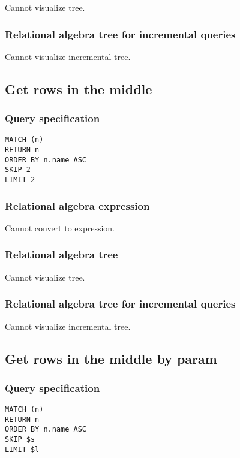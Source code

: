 Cannot visualize tree.

\subsubsection*{Relational algebra tree for incremental queries}

Cannot visualize incremental tree.

\subsection{Get rows in the middle}

\subsubsection*{Query specification}

\begin{lstlisting}
MATCH (n)
RETURN n
ORDER BY n.name ASC
SKIP 2
LIMIT 2
\end{lstlisting}

\subsubsection*{Relational algebra expression}

Cannot convert to expression.

\subsubsection*{Relational algebra tree}

Cannot visualize tree.

\subsubsection*{Relational algebra tree for incremental queries}

Cannot visualize incremental tree.

\subsection{Get rows in the middle by param}

\subsubsection*{Query specification}

\begin{lstlisting}
MATCH (n)
RETURN n
ORDER BY n.name ASC
SKIP $s
LIMIT $l
\end{lstlisting}

